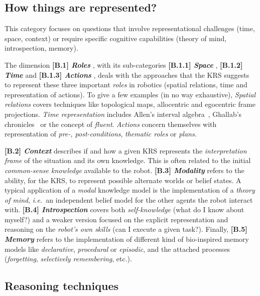 \documentclass{IEEEtran}
\newcommand{\ie}{{\textit{i.e.\ }}}
\newcommand{\taxon}[2]{%
    \textbf{[#1] \emph{#2}}
}
\begin{document}
\subsection{How things are represented?}
\label{sect|higher-level-domain-representation}

This category focuses on questions that involve
representational challenges (time, space, context) or require specific
cognitive capabilities (theory of mind, introspection, memory).

The dimension \taxon{B.1}{Roles}, with its sub-categories \taxon{B.1.1}{Space},
\taxon{B.1.2}{Time} and \taxon{B.1.3}{Actions}, deals with the approaches that
the KRS suggests to represent these three important \emph{roles} in robotics
(spatial relations, time and representation of actions). To give a few examples
(in no way exhaustive), \emph{Spatial relations} covers techniques like
topological maps, allocentric and egocentric frame projections. \emph{Time
representation} includes Allen's interval algebra~\cite{Allen1984}, Ghallab's
chronicles~\cite{Ghallab1996} or the concept of \emph{fluent}. \emph{Actions}
concern themselves with representation of \emph{pre-, post-conditions},
\emph{thematic roles} or \emph{plans}.

\taxon{B.2}{Context} describes if and how a given KRS represents the
\emph{interpretation frame} of the situation and its own knowledge. This is
often related to the initial \emph{common-sense knowledge} available to the
robot. \taxon{B.3}{Modality} refers to the ability, for the KRS, to represent
possible alternate worlds or belief states. A typical application of a
\emph{modal} knowledge model is the implementation of a \emph{theory of mind},
\ie an independent belief model for the other agents the robot interact with.
\taxon{B.4}{Introspection} covers both \emph{self-knowledge} (what do I know
about myself?) and a weaker version focused on the explicit representation and
reasoning on the \emph{robot's own skills} (can I execute a given task?).
Finally, \taxon{B.5}{Memory} refers to the implementation of
different kind of bio-inspired memory models like \emph{declarative},
\emph{procedural} or \emph{episodic}, and the attached processes
(\emph{forgetting}, \emph{selectively remembering}, etc.).

\subsection{Reasoning techniques}
\label{sect|reasoning}
\end{document}
